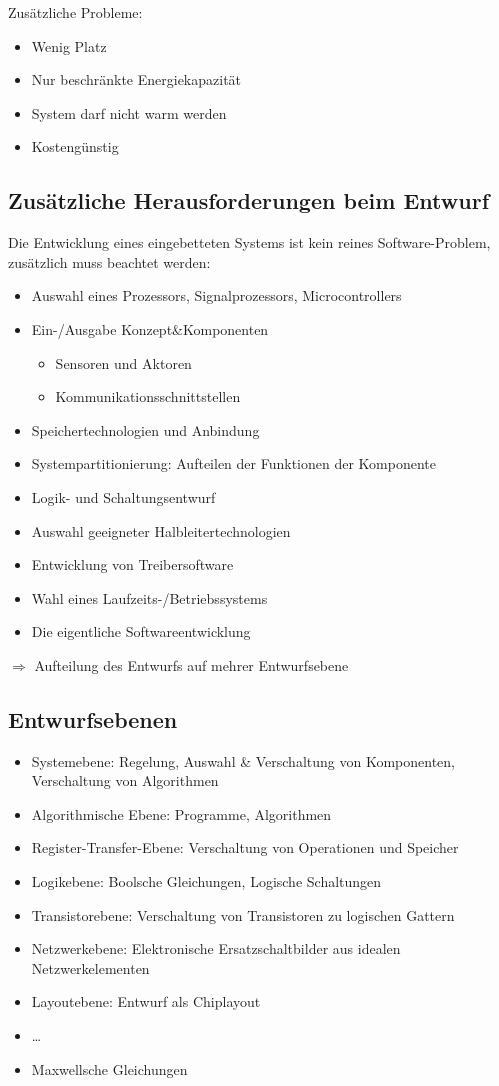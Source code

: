 Zusätzliche Probleme:
\begin{itemize}
    \item Wenig Platz
    \item Nur beschränkte Energiekapazität
    \item System darf nicht warm werden
    \item Kostengünstig
\end{itemize}

\subsection{Zusätzliche Herausforderungen beim Entwurf}
Die Entwicklung eines eingebetteten Systems ist kein reines Software-Problem, zusätzlich muss beachtet werden:
\begin{itemize}
    \item Auswahl eines Prozessors, Signalprozessors, Microcontrollers
    \item Ein-/Ausgabe Konzept\&Komponenten
        \begin{itemize}
            \item Sensoren und Aktoren
            \item Kommunikationsschnittstellen
        \end{itemize}
    \item Speichertechnologien und Anbindung
    \item Systempartitionierung: Aufteilen der Funktionen der Komponente
    \item Logik- und Schaltungsentwurf
    \item Auswahl geeigneter Halbleitertechnologien
    \item Entwicklung von Treibersoftware
    \item Wahl eines Laufzeits-/Betriebssystems
    \item Die eigentliche Softwareentwicklung
\end{itemize}
$\Rightarrow$ Aufteilung des Entwurfs auf mehrer Entwurfsebene

\subsection{Entwurfsebenen}
\begin{itemize}
    \item Systemebene: Regelung, Auswahl \& Verschaltung von Komponenten, Verschaltung von Algorithmen
    \item Algorithmische Ebene: Programme, Algorithmen
    \item Register-Transfer-Ebene: Verschaltung von Operationen und Speicher
    \item Logikebene: Boolsche Gleichungen, Logische Schaltungen
    \item Transistorebene: Verschaltung von Transistoren zu logischen Gattern
    \item Netzwerkebene: Elektronische Ersatzschaltbilder aus idealen Netzwerkelementen
    \item Layoutebene: Entwurf als Chiplayout
    \item \ldots
    \item Maxwellsche Gleichungen
\end{itemize}

